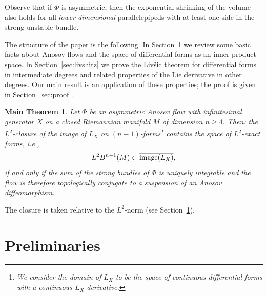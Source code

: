 \documentclass[11pt,letterpaper,reqno,abstract=true]{scrartcl}
\theoremstyle{plain}                              %
\newtheorem*{mainthm}{Main Theorem}
\theoremstyle{definition}                         %
\theoremstyle{remark}                             %
\begin{document}
Observe that if $\Phi$ is asymmetric, then the exponential shrinking of the volume also holds for all \emph{lower dimensional} parallelepipeds with at least one side in the strong unstable bundle.

The structure of the paper is the following. In Section~\ref{sec:preliminaries} we review some basic facts about Anosov flows and the space of differential forms as an inner product space. In Section~\ref{sec:livshitz} we prove the Liv\v{s}ic theorem for differential forms in intermediate degrees and related properties of the Lie derivative in other degrees. Our main result is an application of these properties; the proof is given in Section~\ref{sec:proof}.

\begin{mainthm}
  Let $\Phi$ be an asymmetric Anosov flow with infinitesimal generator $X$ on a closed Riemannian manifold $M$ of dimension $n \geq 4$. Then: the $L^2$-closure of the image of $L_X$ on $(n-1)$-forms\footnote{We consider the domain of $L_X$ to be the space of continuous differential forms with a continuous $L_X$-derivative.} contains the space of $L^2$-exact forms, i.e.,
  \begin{displaymath}
    L^2 B^{n-1}(M) \subset \overline{\text{\normalfont image}(L_X)},
  \end{displaymath}
  if and only if the sum of the strong bundles of $\Phi$ is uniquely integrable and the flow is therefore topologically conjugate to a suspension of an Anosov diffeomorphism.
\end{mainthm}

The closure is taken relative to the $L^2$-norm (see Section~\ref{sec:preliminaries}).


                             


% 


\section{Preliminaries}
\label{sec:preliminaries}
\end{document}
